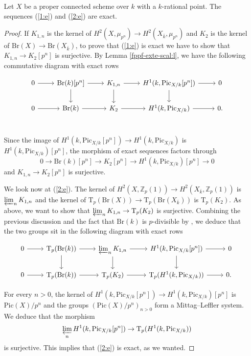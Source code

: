 \documentclass[11pt]{amsart}
\newcommand{\spa}{\medskip}
\newcommand{\kbar}{{\bar{k}}}
\newcommand{\Zp}{{\mathbb{Z}_{p}}}
\newcommand{\Pic}{\mathrm{Pic}}
\newcommand{\Br}{\mathrm{Br}}
\newcommand{\mupn}{{\mu_{p^n}}}
\newcommand{\Tp}{\mathrm{T}_p}
\begin{document}
\begin{prop}\label{Kummer-k-inv:p} Let $X$ be a proper connected scheme over $k$ with a $k$-rational point. The sequences (\ref{1:e}) and (\ref{2:e}) are exact.
\end{prop}
\begin{proof}


If $K_{1,n}$ is the kernel of $H^2_{}(X,\mupn)\to H^2(X_\kbar,\mupn)$ and $K_{2}$ is the kernel of $\Br(X)\to \Br(X_\kbar)$, to prove that (\ref{1:e}) is exact we have to show that $K_{1,n}\to K_{2}[p^n]$ is surjective. By Lemma \ref{fppf-exte-scal:l}, we have the following commutative diagram with exact rows 

	\begin{equation*}\begin{tikzcd}
		0\arrow[r] &\Br(k)[p^n]\arrow[d,""]\arrow[r] &  K_{1,n}\arrow[d,""]\arrow[r] & H^1_{}(k,\Pic_{X/k}[p^n])\arrow[r]\arrow[d,""] & 0\\
		0\arrow[r]& \Br(k) \arrow[r]& K_2\arrow[r]& H^1_{}(k,\Pic_{X/k})\arrow[r]  & 0.\\
	\end{tikzcd}
\end{equation*}

Since the image of $H^1(k,\Pic_{X/k}[p^n])\to H^1_{}(k,\Pic_{X/k})$ is $H^1_{}(k,\Pic_{X/k})[p^n]$, the morphism of exact sequences factors through $$0\to \Br(k)[p^n]\to K_2[p^n]\to H^1_{}(k,\Pic_{X/k})[p^n]\to 0$$ and $K_{1,n}\to K_2[p^n]$ is surjective.

\spa

We look now at (\ref{2:e}). The kernel of $H^2(X,\Zp(1))\to H^2(X_\kbar,\Zp(1))$ is $\varprojlim_n K_{1,n}$ and the kernel of $\Tp(\Br(X))\to \Tp(\Br(X_\kbar))$ is $\Tp(K_2)$. As above, we want to show that $\varprojlim_n K_{1,n}\to \Tp(K_2)$ is surjective. Combining the previous discussion and the fact that $\Br(k)$ is $p$-divisible by \cite[Thm. 1.3.7]{CS21}, we deduce that the two groups sit in the following diagram with exact rows
	
	\begin{equation*}\begin{tikzcd}
			0\arrow[r] &\Tp(\Br(k))\arrow[d,""]\arrow[r] &  \varprojlim_n K_{1,n}\arrow[d,""]\arrow[r] & H^1_{}(k,\Pic_{X/k}[p^n])\arrow[r]\arrow[d,""] & 0\\
			0\arrow[r]& \Tp(\Br(k)) \arrow[r]& \Tp(K_2)\arrow[r]& \Tp(H^1_{}(k,\Pic_{X/k}))\arrow[r]& 0.\
		\end{tikzcd}
	\end{equation*}


For every $n>0$, the kernel of $H^1_{}(k,\Pic_{X/k}[p^n]) \to H^1_{}(k,\Pic_{X/k})[p^n]$ is $\Pic(X)/p^n$ and the groups $(\Pic(X)/p^n)_{n>0}$ form a Mittag--Leffler system. We deduce that the morphism $$\varprojlim_{n} H^1_{}(k,\Pic_{X/k}[p^n])\to \Tp(H^1_{}(k,\Pic_{X/k}))$$ is surjective. This implies that (\ref{2:e}) is exact, as we wanted.
\end{proof}
\end{document}
